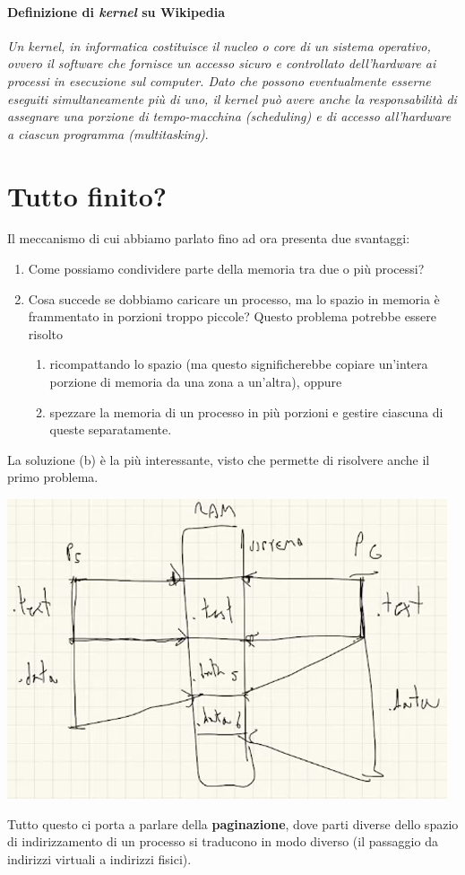 \paragraph{Definizione di \emph{kernel} su Wikipedia} \textit{Un kernel, in informatica costituisce il nucleo o core di un sistema operativo, ovvero il software che fornisce un accesso sicuro e controllato dell'hardware ai processi in esecuzione sul computer. Dato che possono eventualmente esserne eseguiti simultaneamente più di uno, il kernel può avere anche la responsabilità di assegnare una porzione di tempo-macchina (scheduling) e di accesso all'hardware a ciascun programma (multitasking)}.

\clearpage 

\section{Tutto finito?}

Il meccanismo di cui abbiamo parlato fino ad ora presenta due svantaggi:
\begin{enumerate}
	\item Come possiamo condividere parte della memoria tra due o più processi?
	\item Cosa succede se dobbiamo caricare un processo, ma lo spazio in memoria è frammentato in porzioni troppo piccole? Questo problema potrebbe essere risolto
	\begin{enumerate}
		\item ricompattando lo spazio (ma questo significherebbe copiare un'intera porzione di memoria da una zona a un'altra), oppure
		\item spezzare la memoria di un processo in più porzioni e gestire ciascuna di queste separatamente.
	\end{enumerate}
\end{enumerate}
La soluzione (b) è la più interessante, visto che permette di risolvere anche il primo problema. 
\begin{center}
	\includegraphics[scale=.8]{img/211.PNG}
\end{center} Tutto questo ci porta a parlare della \textbf{paginazione}, dove parti diverse dello spazio di indirizzamento di un processo si traducono in modo diverso (il passaggio da indirizzi virtuali a indirizzi fisici).